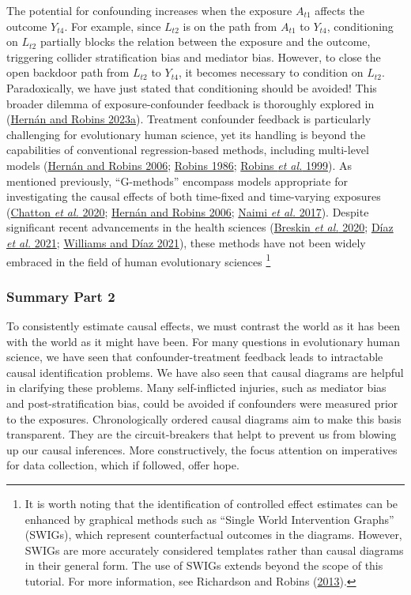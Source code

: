 \documentclass[
  singlecolumn]{article}
\begin{document}
The potential for confounding increases when the exposure \(A_{t1}\)
affects the outcome \(Y_{t4}\). For example, since \(L_{t2}\) is on the
path from \(A_{t1}\) to \(Y_{t4}\), conditioning on \(L_{t2}\) partially
blocks the relation between the exposure and the outcome, triggering
collider stratification bias and mediator bias. However, to close the
open backdoor path from \(L_{t2}\) to \(Y_{t4}\), it becomes necessary
to condition on \(L_{t2}\). Paradoxically, we have just stated that
conditioning should be avoided! This broader dilemma of
exposure-confounder feedback is thoroughly explored in
(\protect\hyperlink{ref-hernuxe1n2023}{Hernán and Robins 2023a}).
Treatment confounder feedback is particularly challenging for
evolutionary human science, yet its handling is beyond the capabilities
of conventional regression-based methods, including multi-level models
(\protect\hyperlink{ref-hernuxe1n2006}{Hernán and Robins 2006};
\protect\hyperlink{ref-robins1986}{Robins 1986};
\protect\hyperlink{ref-robins1999}{Robins \emph{et al.} 1999}). As
mentioned previously, ``G-methods'' encompass models appropriate for
investigating the causal effects of both time-fixed and time-varying
exposures (\protect\hyperlink{ref-chatton2020}{Chatton \emph{et al.}
2020}; \protect\hyperlink{ref-hernuxe1n2006}{Hernán and Robins 2006};
\protect\hyperlink{ref-naimi2017}{Naimi \emph{et al.} 2017}). Despite
significant recent advancements in the health sciences
(\protect\hyperlink{ref-breskin2020}{Breskin \emph{et al.} 2020};
\protect\hyperlink{ref-duxedaz2021}{Díaz \emph{et al.} 2021};
\protect\hyperlink{ref-williams2021}{Williams and Díaz 2021}), these
methods have not been widely embraced in the field of human evolutionary
sciences \footnote{It is worth noting that the identification of
  controlled effect estimates can be enhanced by graphical methods such
  as ``Single World Intervention Graphs'' (SWIGs), which represent
  counterfactual outcomes in the diagrams. However, SWIGs are more
  accurately considered templates rather than causal diagrams in their
  general form. The use of SWIGs extends beyond the scope of this
  tutorial. For more information, see Richardson and Robins
  (\protect\hyperlink{ref-richardson2013}{2013}).}

\hypertarget{summary-part-2}{%
\subsubsection{Summary Part 2}\label{summary-part-2}}

To consistently estimate causal effects, we must contrast the world as
it has been with the world as it might have been. For many questions in
evolutionary human science, we have seen that confounder-treatment
feedback leads to intractable causal identification problems. We have
also seen that causal diagrams are helpful in clarifying these problems.
Many self-inflicted injuries, such as mediator bias and
post-stratification bias, could be avoided if confounders were measured
prior to the exposures. Chronologically ordered causal diagrams aim to
make this basis transparent. They are the circuit-breakers that helpt to
prevent us from blowing up our causal inferences. More constructively,
the focus attention on imperatives for data collection, which if
followed, offer hope.
\end{document}
